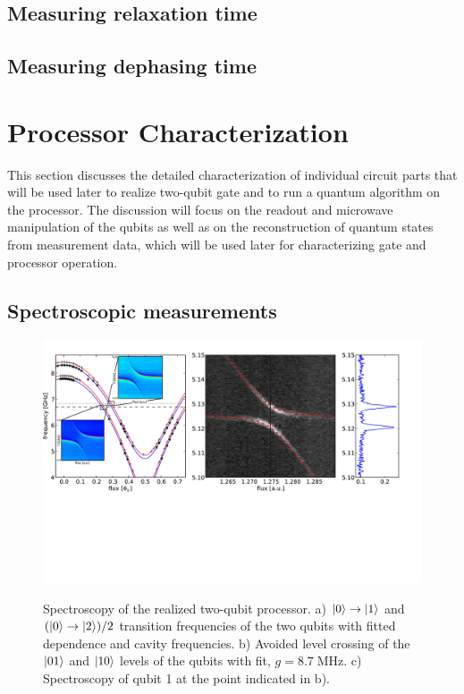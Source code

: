 \section{Measuring relaxation time}

\section{Measuring dephasing time}

\chapter{Processor Characterization}

This section discusses the detailed characterization of individual circuit parts that will be used later to realize two-qubit gate and to run a quantum algorithm on the processor. The discussion will focus on the readout and microwave manipulation of the qubits as well as  on the reconstruction of quantum states from measurement data, which will be used later for characterizing gate and processor operation.

\section{Spectroscopic measurements}

\begin{figure}
	\centering
		\includegraphics[width=1.\textwidth]{"./data/ct5/2011_04_11 - anticrossing/processor_spectroscopy"}
	\label{fig:ProcessorSpectroscopy}
	\caption[Spectroscopy of the Two-Qubit Processor]{Spectroscopy of the realized two-qubit processor. a) $\left| 0 \right>\to\left| 1 \right>$ and $(\left| 0 \right>\to\left| 2 \right>)/2$ transition frequencies of the two qubits with fitted dependence and cavity frequencies. b) Avoided level crossing of the $\left| 01 \right>$ and $\left| 10 \right>$ levels of the qubits with fit, $g = 8.7 \; \mathrm{MHz}$. c) Spectroscopy of qubit 1 at the point indicated in b).}
\end{figure}


